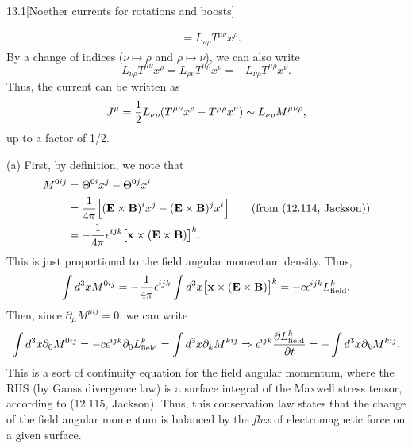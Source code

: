 \documentclass[12pt]{article}
\begin{document}
\begin{problem}{13.1}[Noether currents for rotations and boosts]
\begin{solution}
\begin{align}
    &=L_{\nu\rho}T^{\mu\nu}x^\rho.
\end{align}
By a change of indices ($\nu\mapsto\rho$ and $\rho\mapsto\nu$), we can also
write
\begin{equation}
    L_{\nu\rho}T^{\mu\nu}x^\rho
    =L_{\rho\nu}T^{\mu\rho}x^\nu
    =-L_{\nu\rho}T^{\mu\rho}x^\nu.
\end{equation}
Thus, the current can be written as
\begin{equation}
    J^{\mu}=\frac12L_{\nu\rho}\qty(T^{\mu\nu}x^\rho-T^{\mu\rho}x^\nu)
    \sim L_{\nu\rho}M^{\mu\nu\rho}, 
\end{equation}
up to a factor of 1/2.

(a) First, by definition, we note that
\begin{align}
    M^{0ij}&=\Theta^{0i}x^j-\Theta^{0j}x^i\notag\\
    &=\frac1{4\pi}\qty[(\vb{E}\times\vb{B})^ix^j-(\vb{E}\times\vb{B})^jx^i]
    \tag{from (12.114, Jackson)}\\
    &=-\frac1{4\pi}\epsilon^{ijk}\qty[\vb{x}\times(\vb{E}\times\vb{B})]^k.
\end{align}
This is just proportional to the field angular momentum density. Thus,
\begin{equation}
    \int d^3xM^{0ij}=-\frac1{4\pi}\epsilon^{ijk}\int d^3x
\qty[\vb{x}\times\qty(\vb{E}\times\vb{B})]^k
=-c\epsilon^{ijk}L_{\text{field}}^k.
\end{equation}
Then, since $\partial_\mu M^{\mu ij}=0$, we can write
\begin{equation}
    \int d^3x\partial_0 M^{0ij}
    =-c\epsilon^{ijk}\partial_0L_{\text{field}}^k=\int d^3x\partial_k M^{kij}
    \Rightarrow\epsilon^{ijk}\frac{\partial L_{\text{field}}^k}{\partial t}
    =-\int d^3x\partial_kM^{kij}.
\end{equation}
This is a sort of continuity equation for the field angular momentum, where the
RHS (by Gauss divergence law) is a surface integral of the Maxwell stress 
tensor, according to (12.115, Jackson). Thus, this conservation law states that
the change of the field angular momentum is balanced by the \textit{flux} of 
electromagnetic force on a given surface.


\end{solution}
\end{problem}
\end{document}
